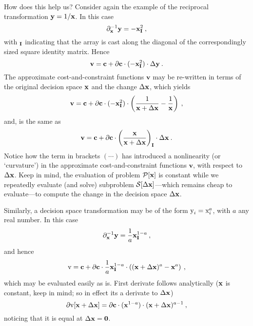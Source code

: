 \documentclass[11pt]{article}
\begin{document}
How does this help us? Consider again the example of the reciprocal transformation $\mathbf{y} = 1/ \mathbf{x}$. In this case
\begin{equation}
\partial_{\mathbf{x}}^{-1} \mathbf{y} = - \mathbf{x}_{\mathbf{I}}^2   \: ,
\end{equation}
with $_{\mathbf{I}}$ indicating that the array is cast along the diagonal of the correspondingly sized square identity matrix. Hence
\begin{equation}
    \textbf{v} = \mathbf{c} + \partial \mathbf{c}  \cdot (-\mathbf{x}_{\mathbf{I}}^2) \cdot \Delta \mathbf{y}  \:.
\end{equation}
The approximate cost-and-constraint functions $\textbf{v}$ may be re-written in terms of the original decision space $\mathbf{x}$ and the change $\Delta \mathbf{x}$, which yields
\begin{equation}
    \textbf{v} = \mathbf{c} + \partial \mathbf{c} \cdot (-\mathbf{x}_{\mathbf{I}}^2)  \cdot \left( \frac{1}{ \mathbf{x} + \Delta\mathbf{x}} - \frac{1}{\mathbf{x}} \right)   \:,
\end{equation}
and, is the same as
\begin{equation}
    \textbf{v} = \mathbf{c} + \partial \mathbf{c}  \cdot \left( \frac{\mathbf{x}}{\mathbf{x} + \Delta \mathbf{x}} \right)_{\mathbf{I}}\cdot \Delta \mathbf{x}   \:.
\end{equation}
Notice how the term in brackets $(\cdots)$ has introduced a nonlinearity (or `curvature') in the approximate cost-and-constraint functions $\textbf{v}$, with respect to $\Delta \mathbf{x}$. Keep in mind, the evaluation of problem $\mathcal{P} [\mathbf{x}]$ is constant while we repeatedly evaluate (and solve) subproblem $\mathcal{S}[\Delta \mathbf{x}]$---which remains cheap to evaluate---to compute the change in the decision space $\Delta \mathbf{x}$. 

Similarly, a decision space transformation may be of the form $\textrm{y}_i = \textrm{x}_i^a$, with $a$ any real number. In this case
\begin{equation}
\partial_{\mathbf{x}}^{-1} \mathbf{y} = \frac {1}{a} \mathbf{x}_{\mathbf{I}}^{1-a}   \: ,
\end{equation}
and hence
\begin{equation}
    \textrm{v} = \mathbf{c} + \partial \mathbf{c} \cdot \frac {1}{a}  \mathbf{x}_{\mathbf{I}}^{1-a}  \cdot \left( (\mathbf{x} + \Delta\mathbf{x})^a - \mathbf{x}^a \right)   \:,
\end{equation}
which may be evaluated easily as is. First derivate follows analytically ($\mathbf{x}$ is constant, keep in mind; so in effect its a derivate to $\Delta \mathbf{x}$)
\begin{equation}
\partial\textrm{v}[\mathbf{x} + \Delta \mathbf{x}] = \partial \mathbf{c} \cdot (\mathbf{x}^{1-a}) \cdot (\mathbf{x} + \Delta \mathbf{x})^{a-1} \:,
\end{equation}
noticing that it is equal at $\Delta \mathbf{x} = \mathbf{0}$.
\end{document}
